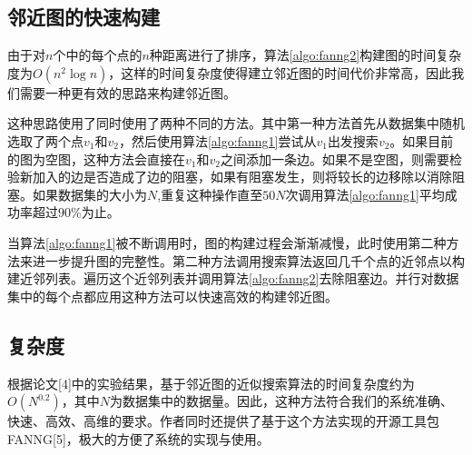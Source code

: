 \subsection{邻近图的快速构建}

由于对$n$个中的每个点的$n$种距离进行了排序，算法\ref{algo:fanng2}构建图的时间复杂度为$O(n^2\log{n})$，这样的时间复杂度使得建立邻近图的时间代价非常高，因此我们需要一种更有效的思路来构建邻近图。

这种思路使用了同时使用了两种不同的方法。其中第一种方法首先从数据集中随机选取了两个点$v_1$和$v_2$，然后使用算法\ref{algo:fanng1}尝试从$v_1$出发搜索$v_2$。如果目前的图为空图，这种方法会直接在$v_1$和$v_2$之间添加一条边。如果不是空图，则需要检验新加入的边是否造成了边的阻塞，如果有阻塞发生，则将较长的边移除以消除阻塞。如果数据集的大小为$N$,重复这种操作直至$50N$次调用算法\ref{algo:fanng1}平均成功率超过$90\%$为止。

当算法\ref{algo:fanng1}被不断调用时，图的构建过程会渐渐减慢，此时使用第二种方法来进一步提升图的完整性。第二种方法调用搜索算法返回几千个点的近邻点以构建近邻列表。遍历这个近邻列表并调用算法\ref{algo:fanng2}去除阻塞边。并行对数据集中的每个点都应用这种方法可以快速高效的构建邻近图。

\subsection{复杂度}

根据论文[4]中的实验结果，基于邻近图的近似搜索算法的时间复杂度约为$O(N^{0.2})$，其中$N$为数据集中的数据量。因此，这种方法符合我们的系统准确、快速、高效、高维的要求。作者同时还提供了基于这个方法实现的开源工具包FANNG[5]，极大的方便了系统的实现与使用。


